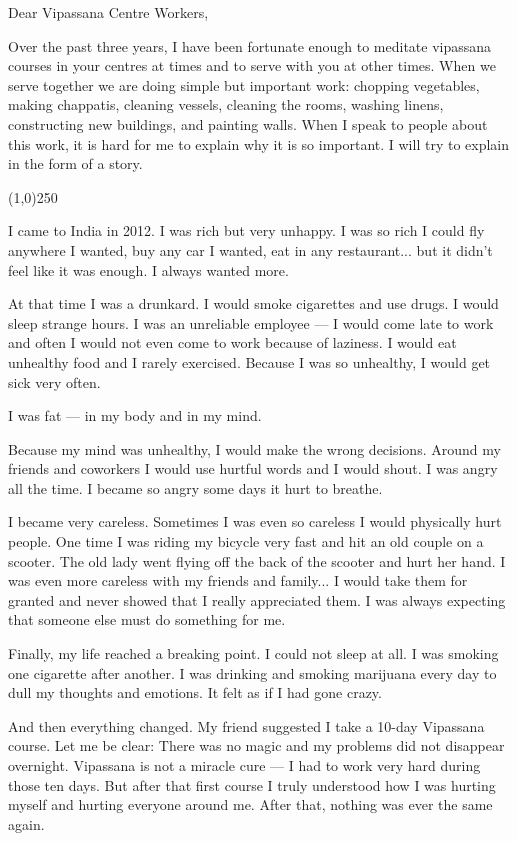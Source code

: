 \documentclass{article}
\begin{document}
Dear Vipassana Centre Workers,

Over the past three years, I have been fortunate enough to meditate vipassana courses
in your centres at times and to serve with you at other times. When we serve together
we are doing simple but important work: chopping vegetables, making chappatis,
cleaning vessels, cleaning the rooms, washing linens, constructing new buildings, and
painting walls. When I speak to people about this work, it is hard for me to explain
why it is so important. I will try to explain in the form of a story.

\begin{center}
\line(1,0){250}
\end{center}

I came to India in 2012. I was rich but very unhappy. I was so rich I could fly
anywhere I wanted, buy any car I wanted, eat in any restaurant... but it didn't feel
like it was enough. I always wanted more.

At that time I was a drunkard. I would smoke cigarettes and
use drugs. I would sleep strange hours. I was an unreliable employee --- I would come
late to work and often I would not even come to work because of laziness. I would eat
unhealthy food and I rarely exercised. Because I was so unhealthy, I would get sick
very often.

I was fat --- in my body and in my mind.

Because my mind was unhealthy, I would make the wrong decisions. Around my friends
and coworkers I would use hurtful words and I would shout. I was angry all the
time. I became so angry some days it hurt to breathe.

I became very careless. Sometimes I was even so careless I would physically hurt
people. One time I was riding my bicycle very fast and hit an old couple on a
scooter. The old lady went flying off the back of the scooter and hurt her hand. I
was even more careless with my friends and family... I would take them for granted
and never showed that I really appreciated them. I was always expecting that someone
else must do something for me.

Finally, my life reached a breaking point. I could not sleep at all. I was smoking
one cigarette after another. I was drinking and smoking marijuana every day to dull
my thoughts and emotions. It felt as if I had gone crazy.

And then everything changed. My friend suggested I take a 10-day Vipassana
course. Let me be clear: There was no magic and my problems did not disappear
overnight. Vipassana is not a miracle cure --- I had to work very hard during those
ten days. But after that first course I truly understood how I was hurting myself
and hurting everyone around me. After that, nothing was ever the same again.
\end{document}

